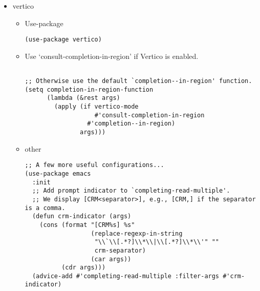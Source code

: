 \documentclass{article}
\begin{document}
\begin{itemize}
\begin{verbatim}
;; Install and configure tree-sitter
(use-package tree-sitter
  :ensure t
         )

;; Install and configure tree-sitter-langs
(use-package tree-sitter-langs
  :ensure t
  :after tree-sitter
  :config
  (add-hook 'tree-sitter-after-on-hook #'tree-sitter-hl-mode))


(global-tree-sitter-mode)
(add-hook 'tree-sitter-after-on-hook #'tree-sitter-hl-mode)

(defun disable-tree-sitter-for-org-mode ()
  (when (eq major-mode 'org-mode)
    (tree-sitter-mode -1)))

(add-hook 'tree-sitter-mode-hook #'disable-tree-sitter-for-org-mode)
\end{verbatim}


\item vertico
\label{sec:orgb88f6a7}
\begin{itemize}
\item Use-package
\label{sec:org171590c}
\begin{verbatim}
(use-package vertico)
\end{verbatim}

\item Use `consult-completion-in-region' if Vertico is enabled.
\label{sec:orgf2cc9f9}
\begin{verbatim}

;; Otherwise use the default `completion--in-region' function.
(setq completion-in-region-function
      (lambda (&rest args)
        (apply (if vertico-mode
                   #'consult-completion-in-region
                 #'completion--in-region)
               args)))

\end{verbatim}
\item other
\label{sec:orge8fddf8}
\begin{verbatim}
;; A few more useful configurations...
(use-package emacs
  :init
  ;; Add prompt indicator to `completing-read-multiple'.
  ;; We display [CRM<separator>], e.g., [CRM,] if the separator is a comma.
  (defun crm-indicator (args)
    (cons (format "[CRM%s] %s"
                  (replace-regexp-in-string
                   "\\`\\[.*?]\\*\\|\\[.*?]\\*\\'" ""
                   crm-separator)
                  (car args))
          (cdr args)))
  (advice-add #'completing-read-multiple :filter-args #'crm-indicator)


\end{verbatim}
\end{itemize}
\end{itemize}
\end{document}
